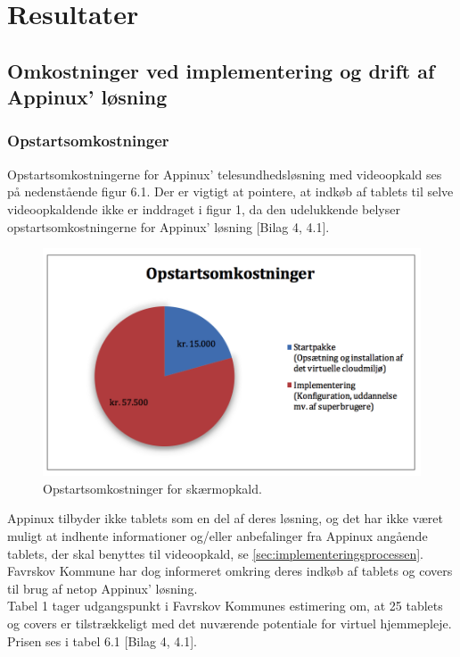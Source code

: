 \section{Resultater}
\subsection{Omkostninger ved implementering og drift af Appinux' løsning}
\subsubsection{Opstartsomkostninger}
Opstartsomkostningerne for Appinux’ telesundhedsløsning med videoopkald ses på nedenstående figur 6.1. Der er vigtigt at pointere, at indkøb af tablets til selve videoopkaldende ikke er inddraget i figur 1, da den udelukkende belyser opstartsomkostningerne for Appinux’ løsning [Bilag 4, 4.1].

\begin{figure}[H]
	\centering
	\includegraphics[width=1\textwidth]{Figurer/Snip20160504_26}
	\caption{Opstartsomkostninger for skærmopkald.}
\end{figure}

Appinux tilbyder ikke tablets som en del af deres løsning, og det har ikke været muligt at indhente informationer og/eller anbefalinger fra Appinux angående tablets, der skal benyttes til videoopkald, se \vref{sec:implementeringsprocessen}.\\
Favrskov Kommune har dog informeret omkring deres indkøb af tablets og covers til brug af netop Appinux’ løsning. \\
Tabel 1 tager udgangspunkt i Favrskov Kommunes estimering om, at 25 tablets og covers er tilstrækkeligt med det nuværende potentiale for virtuel hjemmepleje. Prisen ses i tabel 6.1 [Bilag 4, 4.1]. 

